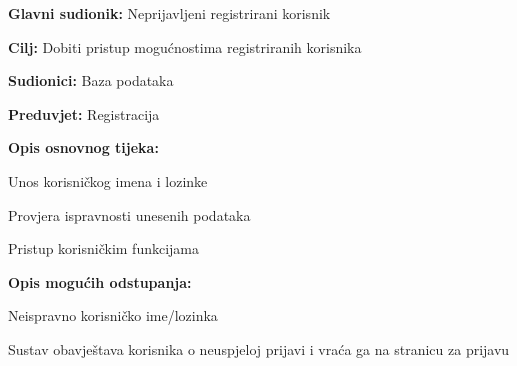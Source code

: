 					\noindent {}
					\begin{packed_item}
	
						\item \textbf{Glavni sudionik:} Neprijavljeni registrirani korisnik
						\item  \textbf{Cilj:} Dobiti pristup mogućnostima registriranih korisnika
						\item  \textbf{Sudionici:} Baza podataka
						\item  \textbf{Preduvjet:} Registracija
						\item  \textbf{Opis osnovnog tijeka:}
						
						\item[] \begin{packed_enum}
	
							\item Unos korisničkog imena i lozinke
							\item Provjera ispravnosti unesenih podataka
							\item Pristup korisničkim funkcijama
						\end{packed_enum}
						
						\item  \textbf{Opis mogućih odstupanja:}
						
						\item[] \begin{packed_item}
	
							\item[2.a] Neispravno korisničko ime/lozinka
							\item[] \begin{packed_enum}
								
								\item Sustav obavještava korisnika o neuspjeloj prijavi i vraća ga na stranicu za prijavu
								
							\end{packed_enum}
							
						\end{packed_item}
					\end{packed_item}
					\pagebreak
					
